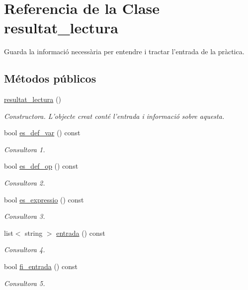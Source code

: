 \hypertarget{classresultat__lectura}{}\section{Referencia de la Clase resultat\+\_\+lectura}
\label{classresultat__lectura}


Guarda la informació necessària per entendre i tractar l’entrada de la pràctica.  


\subsection*{Métodos públicos}
\begin{DoxyCompactItemize}
\item 
\hyperlink{classresultat__lectura_a73ef39653019fabadde9454451121b3f}{resultat\+\_\+lectura} ()
\begin{DoxyCompactList}\small\item\em Constructora. L’objecte creat conté l’entrada i informació sobre aquesta. \end{DoxyCompactList}\item 
bool \hyperlink{classresultat__lectura_a4c84ef4ddea623e7a680c639c084d11d}{es\+\_\+def\+\_\+var} () const
\begin{DoxyCompactList}\small\item\em Consultora 1. \end{DoxyCompactList}\item 
bool \hyperlink{classresultat__lectura_ac1f77e1379c99557c3bfdf2d627594f0}{es\+\_\+def\+\_\+op} () const
\begin{DoxyCompactList}\small\item\em Consultora 2. \end{DoxyCompactList}\item 
bool \hyperlink{classresultat__lectura_a0e73a239ad6dd63b591105a5553bef6f}{es\+\_\+expressio} () const
\begin{DoxyCompactList}\small\item\em Consultora 3. \end{DoxyCompactList}\item 
list$<$ string $>$ \hyperlink{classresultat__lectura_a2b6b1c0d200ea75619f7ad50600551c6}{entrada} () const
\begin{DoxyCompactList}\small\item\em Consultora 4. \end{DoxyCompactList}\item 
bool \hyperlink{classresultat__lectura_a178d0aae65fbce754ec5d99a04732bf0}{fi\+\_\+entrada} () const
\begin{DoxyCompactList}\small\item\em Consultora 5. \end{DoxyCompactList}\end{DoxyCompactItemize}


